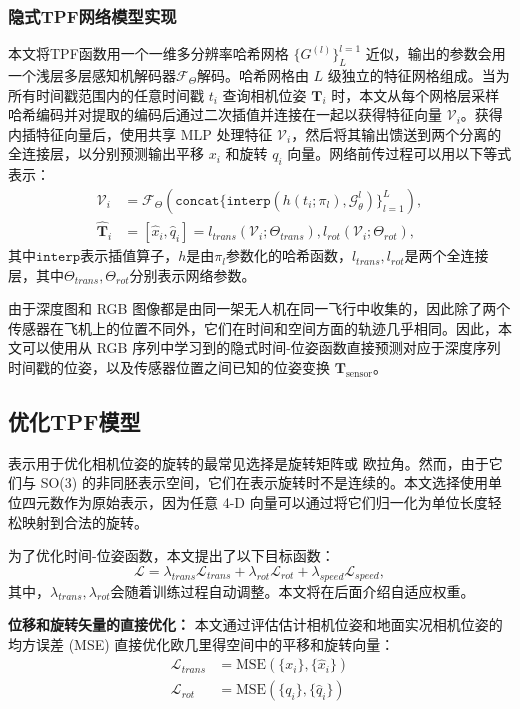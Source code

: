 \subsubsection{隐式TPF网络模型实现}

本文将TPF函数用一个一维多分辨率哈希网格 $\{G^{(l)}\}_L^{l=1}$ 近似，输出的参数会用一个浅层多层感知机解码器$\mathcal{F}_\Theta$解码。哈希网格由 $L$ 级独立的特征网格组成。当为所有时间戳范围内的任意时间戳 $t_i$ 查询相机位姿 $\mathbf{T}_i$ 时，本文从每个网格层采样哈希编码并对提取的编码后通过二次插值并连接在一起以获得特征向量 $\mathcal{V}_i$。获得内插特征向量后，使用共享 MLP 处理特征 $\mathcal{V}_i$，然后将其输出馈送到两个分离的全连接层，以分别预测输出平移 $x_i$ 和旋转 $q_i$ 向量。网络前传过程可以用以下等式表示：
\begin{align}
    \mathcal{V}_i&=\mathcal{F}_\Theta(\mathtt{concat}\{\mathtt{interp}(h(t_i;\pi_l), \mathcal{G}_\theta^l)\}^L_{l=1}),\\
    \hat{\mathbf{T}}_i &= [\hat{x}_i, \hat{q}_i] = l_{trans}(\mathcal{V}_i; \Theta_{trans}), l_{rot}(\mathcal{V}_i; \Theta_{rot}),
\end{align}
其中$\mathtt{interp}$表示插值算子，$h$是由$π_l$参数化的哈希函数，$l_{trans},l_{rot}$是两个全连接层，其中$\Theta_{trans},\Theta_{rot}$分别表示网络参数。

由于深度图和 RGB 图像都是由同一架无人机在同一飞行中收集的，因此除了两个传感器在飞机上的位置不同外，它们在时间和空间方面的轨迹几乎相同。因此，本文可以使用从 RGB 序列中学习到的隐式时间-位姿函数直接预测对应于深度序列时间戳的位姿，以及传感器位置之间已知的位姿变换 $\mathbf{T}_\text{sensor}$。


\subsection{优化TPF模型}
表示用于优化相机位姿的旋转的最常见选择是旋转矩阵\cite{yen-chen_inerf_2021}或 欧拉角。然而，由于它们与 SO(3) 的非同胚表示空间，它们在表示旋转时不是连续的\cite{kendall_posenet_2015}。本文选择使用单位四元数作为原始表示，因为任意 4-D 向量可以通过将它们归一化为单位长度轻松映射到合法的旋转。

为了优化时间-位姿函数，本文提出了以下目标函数：
\begin{equation}
    \mathcal{L} = \lambda_{trans}\mathcal{L}_{trans}+\lambda_{rot}\mathcal{L}_{rot}+\lambda_{speed}\mathcal{L}_{speed},
\end{equation}
其中，$\lambda_{trans}, \lambda_{rot}$会随着训练过程自动调整。本文将在后面介绍自适应权重。

\textbf{位移和旋转矢量的直接优化：}
本文通过评估估计相机位姿和地面实况相机位姿的均方误差 (MSE) 直接优化欧几里得空间中的平移和旋转向量：
\begin{align}
    \mathcal{L}_{trans} &= \text{MSE}(\{x_i\}, \{\hat{x}_i\})\\
    \mathcal{L}_{rot} &= \text{MSE}(\{q_i\}, \{\hat{q}_i\})
\end{align}

